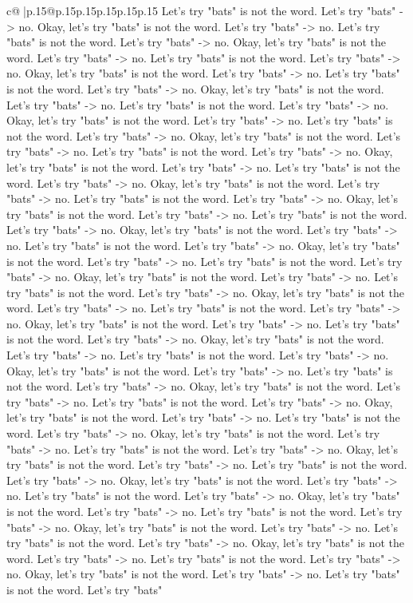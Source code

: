 \documentclass{article}
\begin{document}
{\begin{supertabular}{c@{$\;$}|p{.15\linewidth}@{}p{.15\linewidth}p{.15\linewidth}p{.15\linewidth}p{.15\linewidth}p{.15\linewidth}}
{{{Let's try "bats" is not the word. Let's try "bats" {-}> no. Okay, let's try "bats" is not the word. Let's try "bats" {-}> no. Let's try "bats" is not the word. Let's try "bats" {-}> no. Okay, let's try "bats" is not the word. Let's try "bats" {-}> no. Let's try "bats" is not the word. Let's try "bats" {-}> no. Okay, let's try "bats" is not the word. Let's try "bats" {-}> no. Let's try "bats" is not the word. Let's try "bats" {-}> no. Okay, let's try "bats" is not the word. Let's try "bats" {-}> no. Let's try "bats" is not the word. Let's try "bats" {-}> no. Okay, let's try "bats" is not the word. Let's try "bats" {-}> no. Let's try "bats" is not the word. Let's try "bats" {-}> no. Okay, let's try "bats" is not the word. Let's try "bats" {-}> no. Let's try "bats" is not the word. Let's try "bats" {-}> no. Okay, let's try "bats" is not the word. Let's try "bats" {-}> no. Let's try "bats" is not the word. Let's try "bats" {-}> no. Okay, let's try "bats" is not the word. Let's try "bats" {-}> no. Let's try "bats" is not the word. Let's try "bats" {-}> no. Okay, let's try "bats" is not the word. Let's try "bats" {-}> no. Let's try "bats" is not the word. Let's try "bats" {-}> no. Okay, let's try "bats" is not the word. Let's try "bats" {-}> no. Let's try "bats" is not the word. Let's try "bats" {-}> no. Okay, let's try "bats" is not the word. Let's try "bats" {-}> no. Let's try "bats" is not the word. Let's try "bats" {-}> no. Okay, let's try "bats" is not the word. Let's try "bats" {-}> no. Let's try "bats" is not the word. Let's try "bats" {-}> no. Okay, let's try "bats" is not the word. Let's try "bats" {-}> no. Let's try "bats" is not the word. Let's try "bats" {-}> no. Okay, let's try "bats" is not the word. Let's try "bats" {-}> no. Let's try "bats" is not the word. Let's try "bats" {-}> no. Okay, let's try "bats" is not the word. Let's try "bats" {-}> no. Let's try "bats" is not the word. Let's try "bats" {-}> no. Okay, let's try "bats" is not the word. Let's try "bats" {-}> no. Let's try "bats" is not the word. Let's try "bats" {-}> no. Okay, let's try "bats" is not the word. Let's try "bats" {-}> no. Let's try "bats" is not the word. Let's try "bats" {-}> no. Okay, let's try "bats" is not the word. Let's try "bats" {-}> no. Let's try "bats" is not the word. Let's try "bats" {-}> no. Okay, let's try "bats" is not the word. Let's try "bats" {-}> no. Let's try "bats" is not the word. Let's try "bats" {-}> no. Okay, let's try "bats" is not the word. Let's try "bats" {-}> no. Let's try "bats" is not the word. Let's try "bats" {-}> no. Okay, let's try "bats" is not the word. Let's try "bats" {-}> no. Let's try "bats" is not the word. Let's try "bats" {-}> no. Okay, let's try "bats" is not the word. Let's try "bats" {-}> no. Let's try "bats" is not the word. Let's try "bats" {-}> no. Okay, let's try "bats" is not the word. Let's try "bats" {-}> no. Let's try "bats" is not the word. Let's try "bats" {-}> no. Okay, let's try "bats" is not the word. Let's try "bats" {-}> no. Let's try "bats" is not the word. Let's try "bats" {-}> no. Okay, let's try "bats" is not the word. Let's try "bats" {-}> no. Let's try "bats" is not the word. Let's try "bats" }}}
\end{supertabular}}
\end{document}
